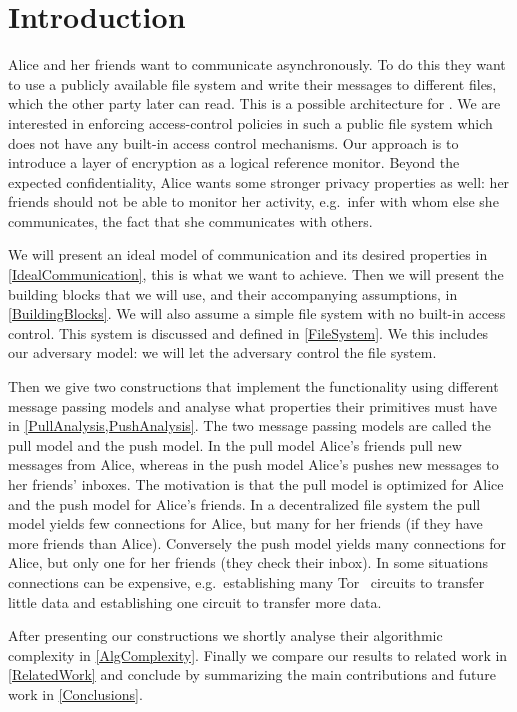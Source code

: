 \acresetall{}
\section{Introduction}\label{Introduction}

Alice and her friends want to communicate asynchronously.
To do this they want to use a publicly available file system and write their 
messages to different files, which the other party later can read.
This is a possible architecture for .
We are interested in enforcing access-control policies in such a public file 
system which does not have any built-in access control mechanisms.
Our approach is to introduce a layer of encryption as a logical reference 
monitor.
Beyond the expected confidentiality, Alice wants some stronger privacy 
properties as well: her friends should not be able to monitor her activity, 
e.g.\ infer with whom else she communicates, the fact that she communicates 
with others.

We will present an ideal model of communication and its desired properties in 
\cref{IdealCommunication}, this is what we want to achieve.
Then we will present the building blocks that we will use, and their 
accompanying assumptions, in \cref{BuildingBlocks}.
We will also assume a simple file system with no built-in access control.
This system is discussed and defined in \cref{FileSystem}.
We this includes our adversary model: we will let the adversary control the 
file system.

Then we give two constructions that implement the functionality using different 
message passing models and analyse what properties their primitives must have 
in \cref{PullAnalysis,PushAnalysis}.
The two message passing models are called the pull model and the push model.
In the pull model Alice's friends pull new messages from Alice, whereas in the 
push model Alice's pushes new messages to her friends' inboxes.
The motivation is that the pull model is optimized for Alice and the push model 
for Alice's friends.
In a decentralized file system the pull model yields few connections for Alice,
but many for her friends (if they have more friends than Alice).
Conversely the push model yields many connections for Alice, but only one for 
her friends (they check their inbox).
In some situations connections can be expensive, e.g.\ establishing many 
Tor~\cite{Tor} circuits to transfer little data and establishing one circuit to 
transfer more data.

After presenting our constructions we shortly analyse their algorithmic 
complexity in \cref{AlgComplexity}.
Finally we compare our results to related work in \cref{RelatedWork} and 
conclude by summarizing the main contributions and future work in 
\cref{Conclusions}.


